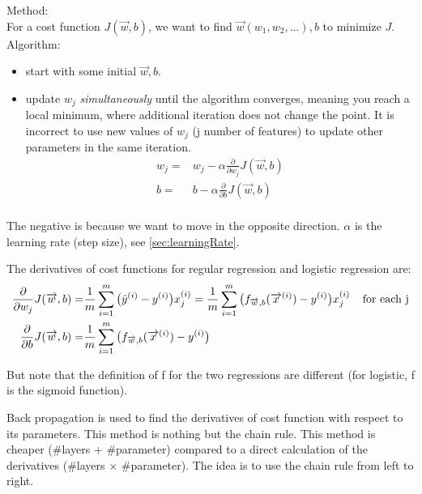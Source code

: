 \documentclass[12pt]{report}
\begin{document}
Method: \\
For a cost function $J(\overrightarrow{w},b)$,  we want to find  $ \overrightarrow{w} (w_1, w_2, ...) , b$ to minimize $J$.\\

Algorithm: \\
\begin{itemize}
\item start with some initial $\overrightarrow{w}, b$.
\item update $w_j$ \textit{simultaneously} until the algorithm converges, meaning you reach a local minimum, where additional iteration does not change the point. It is incorrect to use new values of $w_j$  (j number of features) to update other parameters in the same iteration.
\begin{equation}
\begin{split}
  w_j =& w_j - \alpha \frac{\partial}{\partial w_j} J(\overrightarrow{w},b) \\
  b =& b - \alpha \frac{\partial  }{\partial b} J(\overrightarrow{w},b) \\
\end{split}
\end{equation}
\end{itemize}

The negative is because we want to move in the opposite direction. $\alpha$ is the learning rate (step size), see \ref{sec:learningRate}.

The derivatives of cost functions for regular regression and logistic regression are:
\begin{equation}
\label{eq:derivatives}
\begin{split}
\frac{\partial}{\partial w_j} J(\overrightarrow{w},b) =& \frac{1}{m} \sum_{i=1}^{m} \big(\hat{y}^{(i)} - y^{(i)} \big) x_j^{(i)} = \frac{1}{m} \sum_{i=1}^{m} \big( f_{\overrightarrow{w},b} (\overrightarrow{x}^{(i)}) - y^{(i)} \big) x_j^{(i)} \text{\: \: for each j} \\
\frac{\partial}{\partial b} J(\overrightarrow{w},b)   =& \frac{1}{m} \sum_{i=1}^{m} \big( f_{\overrightarrow{w},b} (\overrightarrow{x}^{(i)})  - y^{(i)} \big)
\end{split}
\end{equation}

But note that the definition of f for the two regressions are different (for logistic, f is the sigmoid function).

Back propagation is used to find the derivatives of cost function with respect to its parameters. This method is nothing but the chain rule. This method is cheaper (\#layers + \#parameter) compared to a direct calculation of the derivatives (\#layers $\times$ \#parameter). The idea is to use the chain rule from left to right.
\end{document}
